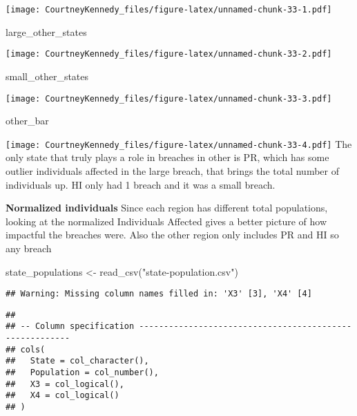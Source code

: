 \documentclass[
]{article}
\newenvironment{Shaded}{\begin{snugshade}}{\end{snugshade}}
\newcommand{\FunctionTok}[1]{\textcolor[rgb]{0.00,0.00,0.00}{#1}}
\newcommand{\NormalTok}[1]{#1}
\newcommand{\OtherTok}[1]{\textcolor[rgb]{0.56,0.35,0.01}{#1}}
\newcommand{\StringTok}[1]{\textcolor[rgb]{0.31,0.60,0.02}{#1}}
\begin{document}
\texttt{[image: CourtneyKennedy\_files/figure-latex/unnamed-chunk-33-1.pdf]}

\begin{Shaded}
\begin{Highlighting}[]
\NormalTok{large\_other\_states}
\end{Highlighting}
\end{Shaded}

\texttt{[image: CourtneyKennedy\_files/figure-latex/unnamed-chunk-33-2.pdf]}

\begin{Shaded}
\begin{Highlighting}[]
\NormalTok{small\_other\_states}
\end{Highlighting}
\end{Shaded}

\texttt{[image: CourtneyKennedy\_files/figure-latex/unnamed-chunk-33-3.pdf]}

\begin{Shaded}
\begin{Highlighting}[]
\NormalTok{other\_bar}
\end{Highlighting}
\end{Shaded}

\texttt{[image: CourtneyKennedy\_files/figure-latex/unnamed-chunk-33-4.pdf]}
The only state that truly plays a role in breaches in other is PR, which
has some outlier individuals affected in the large breach, that brings
the total number of individuals up. HI only had 1 breach and it was a
small breach.

\textbf{Normalized individuals} Since each region has different total
populations, looking at the normalized Individuals Affected gives a
better picture of how impactful the breaches were. Also the other region
only includes PR and HI so any breach

\begin{Shaded}
\begin{Highlighting}[]
\NormalTok{state\_populations }\OtherTok{\textless{}{-}} \FunctionTok{read\_csv}\NormalTok{(}\StringTok{"state{-}population.csv"}\NormalTok{)}
\end{Highlighting}
\end{Shaded}

\begin{verbatim}
## Warning: Missing column names filled in: 'X3' [3], 'X4' [4]
\end{verbatim}

\begin{verbatim}
## 
## -- Column specification --------------------------------------------------------
## cols(
##   State = col_character(),
##   Population = col_number(),
##   X3 = col_logical(),
##   X4 = col_logical()
## )
\end{verbatim}
\end{document}

